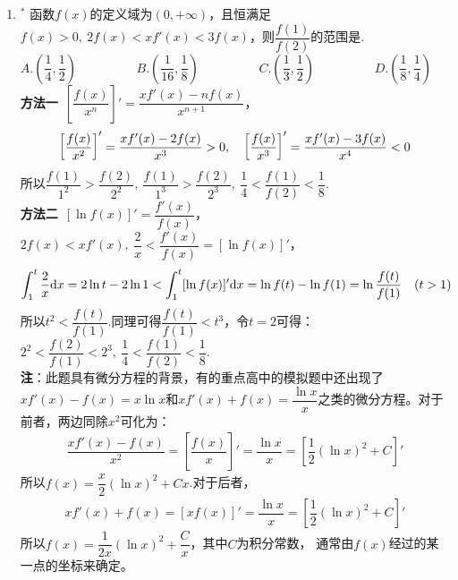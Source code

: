 \begin{enumerate}[label={【\textbf{例\thechapter.\arabic*}】},
 leftmargin=\inteval{\myenumleftmargin}pt,
 itemsep=\inteval{\myenumitempsep}pt,
 itemindent=\inteval{\myenumitemindent}pt]
\item $ ^* $ 函数$ f(x) $的定义域为$ (0,+\infty) $，且恒满足$ f(x)>0,\ 2f(x)<xf'(x)<3f(x) $，则$ \dfrac{f(1)}{f(2)} $的范围是\underline{\hspace{2cm}}.\\
$ A.(\dfrac{1}{4},\dfrac{1}{2})\hspace{2cm} 
  B.(\dfrac{1}{16},\dfrac{1}{8})\hspace{2cm} 
  C.(\dfrac{1}{3},\dfrac{1}{2})\hspace{2cm} 
  D.(\dfrac{1}{8},\dfrac{1}{4})  $ \medskip \\
\textbf{方法一}\ $ \left[\dfrac{f(x)}{x^n}\right]'=
\dfrac{xf'(x)-nf(x)}{x^{n+1}} $，
\begin{gather*}
  \left[\dfrac{f(x)}{x^2}\right]'=\dfrac{xf'(x)-2f(x)}{x^{3}}>0,\quad \left[\dfrac{f(x)}{x^3}\right]'=\dfrac{xf'(x)-3f(x)}{x^{4}}<0
\end{gather*}
所以$ \dfrac{f(1)}{1^2}>\dfrac{f(2)}{2^2},\ 
\dfrac{f(1)}{1^3}>\dfrac{f(2)}{2^3},\
\dfrac{1}{4}<\dfrac{f(1)}{f(2)}<\dfrac{1}{8} $.\\
\textbf{方法二}\ $ [\ln f(x)]'
=\dfrac{f'(x)}{f(x)} $，$ 2f(x)<xf'(x),\ \dfrac{2}{x}
<\dfrac{f'(x)}{f(x)}=[\ln f(x)]' $，
\begin{gather*}
	\int_1^t \dfrac{2}{x}\mathrm{d} x= 2\ln t-2\ln 1<
	\int_1^t [\ln f(x)]'\mathrm{d} x=\ln f(t)-\ln f(1)=
	\ln\dfrac{f(t)}{f(1)} \quad (t>1)
\end{gather*}
所以$ t^2<\dfrac{f(t)}{f(1)} $.同理可得$ \dfrac{f(t)}
{f(1)}<t^3 $，令$ t=2 $可得：$ 2^2<\dfrac{f(2)}{f(1)}<2^3 ,\ \dfrac{1}{4}<\dfrac{f(1)}{f(2)}<\dfrac{1}{8} $.\\
\textbf{注}：此题具有微分方程的背景，有的重点高中的模拟题中还出现了$ xf'(x)-f(x)=x\ln x $和$ xf'(x)+f(x)=\dfrac{\ln x}{x} $之类的微分方程。对于前者，两边同除$ x^2 $可化为：
\begin{gather*}
    \dfrac{xf'(x)-f(x)}{x^2}=\left[\dfrac{f(x)}{x}\right]'= \dfrac{\ln x}{x}=\left[\dfrac{1}{2}(\ln x)^2+C\right]'
\end{gather*}
所以$ f(x)=\dfrac{x}{2}(\ln x)^2+Cx $.对于后者，
\begin{gather*}
    xf'(x)+f(x)=[xf(x)]'=\dfrac{\ln x}{x}=
    \left[\dfrac{1}{2}(\ln x)^2+C\right]'
\end{gather*}
所以$ f(x)=\dfrac{1}{2x}(\ln x)^2+\dfrac{C}{x} $，其中$ C $为积分常数，
通常由$ f(x) $经过的某一点的坐标来确定。


\end{enumerate}
